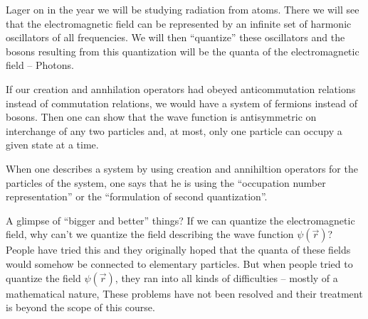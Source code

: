 Lager on in the year we will be studying radiation from atoms. There we will see that the electromagnetic field can be represented by an infinite set of harmonic oscillators of all frequencies. We will then
``quantize'' these oscillators and the bosons resulting from this quantization will be the quanta of the electromagnetic field -- Photons. 

If our creation and annhilation operators had obeyed anticommutation relations instead of commutation relations, we would have a system of fermions instead of bosons. Then one can show that
the wave function is antisymmetric on interchange of any two particles and, at most, only one particle can occupy a given state at a time.

When one describes a system by using creation and annihiltion operators for the particles of the system, one says that he is using the ``occupation number representation'' or the ``formulation of second quantization''.

A glimpse of ``bigger and better'' things? If we can quantize the electromagnetic field, why can't we quantize the field describing the wave function $\psi(\vec{r})$? People have tried this and they 
originally hoped that the quanta of these fields would somehow be connected to elementary particles. But when people tried to quantize the field $\psi(\vec{r})$, they ran into all kinds of 
difficulties -- mostly of a mathematical nature, These problems have not been resolved and their treatment is beyond the scope of this course. 
